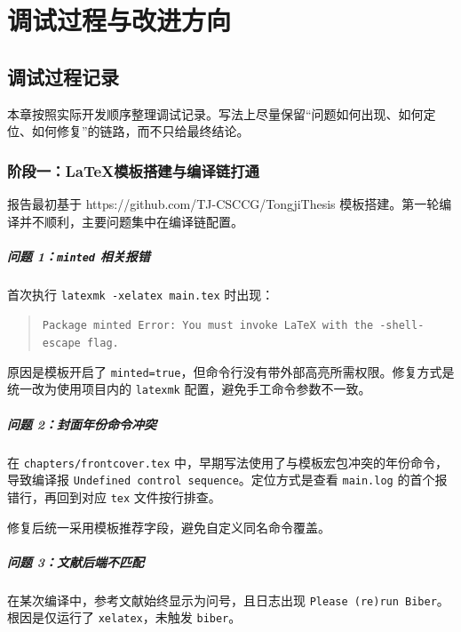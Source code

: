 ﻿\chapter{调试过程与改进方向}\label{chap:reference}

\section{调试过程记录}

本章按照实际开发顺序整理调试记录。写法上尽量保留“问题如何出现、如何定位、如何修复”的链路，而不只给最终结论。

\subsection{阶段一：\LaTeX 模板搭建与编译链打通}

报告最初基于 https://github.com/TJ-CSCCG/TongjiThesis 模板搭建。第一轮编译并不顺利，主要问题集中在编译链配置。

\paragraph{问题 1：\texttt{minted} 相关报错}
首次执行 \texttt{latexmk -xelatex main.tex} 时出现：
\begin{quote}
    \texttt{Package minted Error: You must invoke LaTeX with the -shell-escape flag.}
\end{quote}

原因是模板开启了 \texttt{minted=true}，但命令行没有带外部高亮所需权限。修复方式是统一改为使用项目内的 \texttt{latexmk} 配置，避免手工命令参数不一致。

\paragraph{问题 2：封面年份命令冲突}
在 \texttt{chapters/frontcover.tex} 中，早期写法使用了与模板宏包冲突的年份命令，导致编译报 \texttt{Undefined control sequence}。定位方式是查看 \texttt{main.log} 的首个报错行，再回到对应 \texttt{tex} 文件按行排查。

修复后统一采用模板推荐字段，避免自定义同名命令覆盖。

\paragraph{问题 3：文献后端不匹配}
在某次编译中，参考文献始终显示为问号，且日志出现 \texttt{Please (re)run Biber}。根因是仅运行了 \texttt{xelatex}，未触发 \texttt{biber}。

